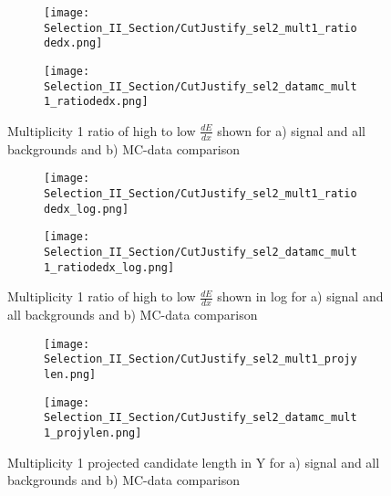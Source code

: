 \begin{figure}[H]
\centering
  \begin{subfigure}[t]{0.4\textwidth}
    \centering
\texttt{[image: Selection\_II\_Section/CutJustify\_sel2\_mult1\_ratiodedx.png]}
    \caption{ }
  \end{subfigure} 
  \hspace{20mm}
  \begin{subfigure}[t]{0.4\textwidth}
    \centering
\texttt{[image: Selection\_II\_Section/CutJustify\_sel2\_datamc\_mult1\_ratiodedx.png]}
    \caption{ }
  \end{subfigure} 
\caption{Multiplicity 1 ratio of high to low $\frac{dE}{dx}$ shown for a) signal and all backgrounds and b) MC-data comparison }
\label{fig:cutjust_sel2_mult1_ratiodedx}
\end{figure}

\begin{figure}[H]
\centering
  \begin{subfigure}[t]{0.4\textwidth}
    \centering
\texttt{[image: Selection\_II\_Section/CutJustify\_sel2\_mult1\_ratiodedx\_log.png]}
    \caption{ }
  \end{subfigure} 
  \hspace{20mm}
  \begin{subfigure}[t]{0.4\textwidth}
    \centering
\texttt{[image: Selection\_II\_Section/CutJustify\_sel2\_datamc\_mult1\_ratiodedx\_log.png]}
   \caption{ }
  \end{subfigure} 
\caption{Multiplicity 1 ratio of high to low $\frac{dE}{dx}$ shown in log for a) signal and all backgrounds and b) MC-data comparison }
\label{fig:cutjust_sel2_mult1_ratiodedx_log}
\end{figure}

\begin{figure}[H]
\centering
  \begin{subfigure}[t]{0.4\textwidth}
    \centering
\texttt{[image: Selection\_II\_Section/CutJustify\_sel2\_mult1\_projylen.png]}
    \caption{ }
  \end{subfigure} 
  \hspace{20mm}
  \begin{subfigure}[t]{0.4\textwidth}
    \centering
\texttt{[image: Selection\_II\_Section/CutJustify\_sel2\_datamc\_mult1\_projylen.png]}
   \caption{ }
  \end{subfigure} 
\caption{Multiplicity 1 projected candidate length in Y for a) signal and all backgrounds and b) MC-data comparison }
\label{fig:cutjust_sel2_mult1_projylen}
\end{figure}

